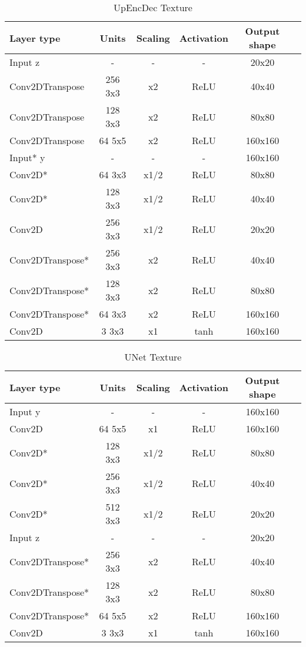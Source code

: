 \begin{table*}
	\centering
	\begin{tabular}{|l|c|c|c|c|c|}
		\hline
		Layer type & Units & Scaling & Activation & Output shape\\
		\hline
		Input z & - & - & - & 20x20 \\
		Conv2DTranspose & 256 3x3 & x2 & ReLU & 40x40 \\
		Conv2DTranspose & 128 3x3 & x2 & ReLU & 80x80 \\
		Conv2DTranspose & 64 5x5 & x2 & ReLU & 160x160 \\
		Input* y & - & - & - & 160x160\\
		Conv2D* & 64 3x3 & x1/2 & ReLU & 80x80 \\
		Conv2D* & 128 3x3 & x1/2 & ReLU & 40x40 \\
		Conv2D & 256 3x3 & x1/2 & ReLU & 20x20 \\
		Conv2DTranspose* & 256 3x3 & x2 & ReLU & 40x40 \\
		Conv2DTranspose* & 128 3x3 & x2 & ReLU & 80x80 \\
		Conv2DTranspose* & 64 3x3 & x2 & ReLU & 160x160 \\
		Conv2D & 3 3x3 & x1 & tanh & 160x160 \\
		\hline
	\end{tabular}
	\caption{UpEncDec Texture}
\end{table*}

\begin{table*}[h]
	\centering
	\begin{tabular}{|l|c|c|c|c|c|}
		\hline
		Layer type & Units & Scaling & Activation & Output shape\\
		\hline
		Input y & - & - & - & 160x160\\
		Conv2D & 64 5x5 & x1 & ReLU & 160x160 \\
		Conv2D* & 128 3x3 & x1/2 & ReLU & 80x80 \\
		Conv2D* & 256 3x3 & x1/2 & ReLU & 40x40 \\
		Conv2D* & 512 3x3 & x1/2 & ReLU & 20x20 \\
		Input z & - & - & - & 20x20 \\
		Conv2DTranspose* & 256 3x3 & x2 & ReLU & 40x40 \\
		Conv2DTranspose* & 128 3x3 & x2 & ReLU & 80x80 \\
		Conv2DTranspose* & 64 5x5 & x2 & ReLU & 160x160 \\
		Conv2D & 3 3x3 & x1 & tanh & 160x160 \\
		\hline
	\end{tabular}
\caption{UNet Texture}
\end{table*}

